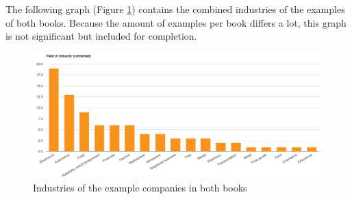 \documentclass[a4]{scrartcl}
\begin{document}
The following graph (Figure \ref{fig:C_graph_i}) contains the combined industries of the examples of both books. Because the amount of examples per book differs a lot, this graph is not significant but included for completion. \cite{digitalmatrix, leadingdigital}


\begin{figure}[h!]
	\centering
	\includegraphics[width=1\textwidth]{images/combi_graph_i.png}
	\caption{Industries of the example companies in both books \cite{digitalmatrix, leadingdigital}}
	\label{fig:C_graph_i}
\end{figure}











\end{document}
